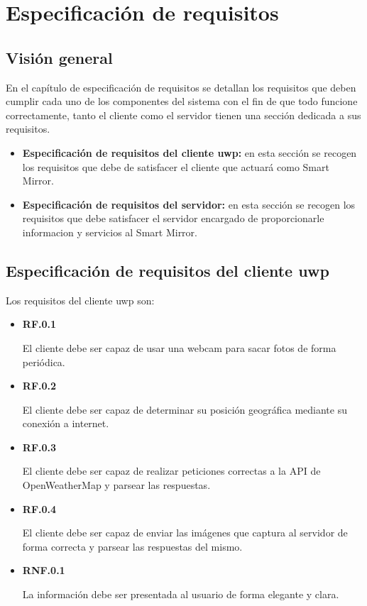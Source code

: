 \chapter{Especificación de requisitos}

\section{Visión general}

En el capítulo de especificación de requisitos se detallan los requisitos que deben cumplir cada uno de los componentes del sistema con el fin de que todo funcione correctamente, tanto el cliente como el servidor tienen una sección dedicada a sus requisitos.

\begin{itemize}
	\item \textbf{Especificación de requisitos del cliente \acrshort{uwp}:} en esta sección se recogen los requisitos que debe de satisfacer el cliente que actuará como Smart Mirror.

	\item \textbf{Especificación de requisitos del servidor:} en esta sección se recogen los requisitos que debe satisfacer el servidor encargado de proporcionarle informacion y servicios al Smart Mirror.
\end{itemize}

\section{Especificación de requisitos del cliente \acrshort{uwp}}

Los requisitos del cliente \acrshort{uwp} son:

\begin{itemize}
	\item \textbf{RF.0.1}

	El cliente debe ser capaz de usar una webcam para sacar fotos de forma periódica.

	\item \textbf{RF.0.2}

	El cliente debe ser capaz de determinar su posición geográfica mediante su conexión a internet.

	\item \textbf{RF.0.3}

	El cliente debe ser capaz de realizar peticiones correctas a la API de OpenWeatherMap y parsear las respuestas.

	\item \textbf{RF.0.4}

	El cliente debe ser capaz de enviar las imágenes que captura al servidor de forma correcta y parsear las respuestas del mismo.

	\item \textbf{RNF.0.1}

	La información debe ser presentada al usuario de forma elegante y clara.

\end{itemize}


